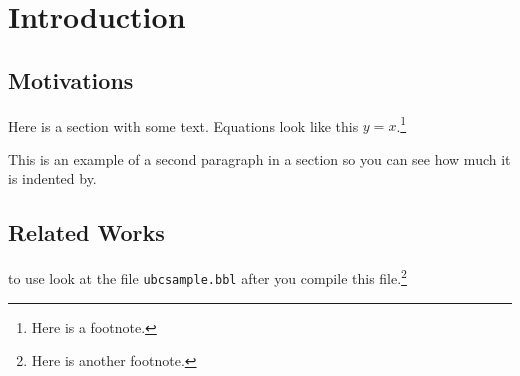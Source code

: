 \documentclass[msc,oneside]{ubcthesis}
\theoremstyle{definition}
\begin{document}



\mainmatter


\chapter{Introduction}

\section{Motivations}
Here is a section with some text.  Equations look like this
$y=x$.\footnote{Here is a footnote.}

This is an example of a second paragraph in a section so you can
see how much it is indented by.

\section{Related Works}

to use look at the file \texttt{ubcsample.bbl} after you compile this
file.\footnote{Here is another footnote.}
\end{document}
